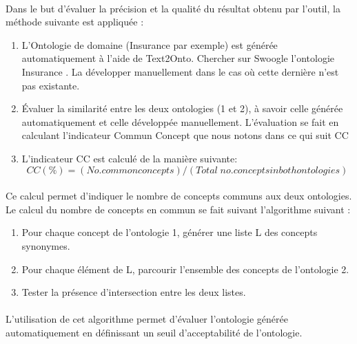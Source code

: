 \documentclass[12pt, a4paper, oneside]{book}
\begin{document}
\paragraph{}
Dans le but d'évaluer la précision et la qualité du résultat obtenu par l'outil, la méthode suivante est appliquée :
\begin{enumerate}
\item L'Ontologie de domaine (Insurance par exemple) est générée automatiquement à l'aide de Text2Onto.
Chercher sur Swoogle l'ontologie Insurance \citep{swoogle}. La développer manuellement dans le cas où cette dernière n'est pas existante.
\item Évaluer la similarité entre les deux ontologies (1 et 2), à savoir celle générée automatiquement et celle développée manuellement. L'évaluation se fait en calculant l'indicateur Commun Concept que nous notons dans ce qui suit CC

\item L'indicateur CC est calculé de la manière suivante: $$CC (\%) = (No. common concepts) / (Total\;no. concepts in both ontologies)$$

\end{enumerate}




\paragraph{}
Ce calcul permet d'indiquer le nombre de concepts communs aux deux ontologies.
Le calcul du nombre de concepts en commun se fait suivant l'algorithme suivant : 

\begin{enumerate}

\item Pour chaque concept de l'ontologie 1, générer une liste L des concepts synonymes.
\item Pour chaque élément de L, parcourir l'ensemble des concepts de l'ontologie 2.
\item Tester la présence d'intersection entre les deux listes.

\end{enumerate}

\paragraph{}

L'utilisation de cet algorithme permet d'évaluer l'ontologie générée automatiquement en définissant un seuil d'acceptabilité de l'ontologie.
\end{document}
